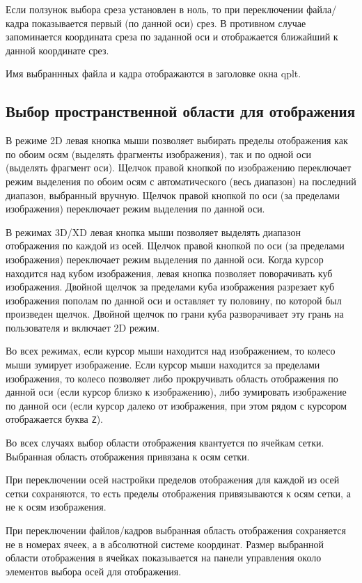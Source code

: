 \documentclass[12pt]{article}
\begin{document}
Если ползунок выбора среза установлен в ноль, то при переключении файла/кадра показывается первый (по данной оси) срез.
В противном случае запоминается координата среза по заданной оси и отображается ближайший к данной координате срез.

Имя выбраннных файла и кадра отображаются в заголовке окна qplt.

\subsection{Выбор пространственной области для отображения}
В режиме 2D левая кнопка мыши позволяет выбирать пределы отображения как по обоим осям (выделять фрагменты изображения),
так и по одной оси (выделять фрагмент оси). Щелчок правой кнопкой по изображению переключает режим выделения
по обоим осям с автоматического (весь диапазон) на последний диапазон, выбранный вручную. 
Щелчок правой кнопкой по оси (за пределами изображения) переключает режим выделения по данной оси.

В режимах 3D/XD левая кнопка мыши позволяет выделять диапазон отображения по каждой из осей. 
Щелчок правой кнопкой по оси (за пределами изображения) переключает режим выделения по данной оси.
Когда курсор  находится над кубом изображения, левая кнопка позволяет поворачивать куб изображения.
Двойной щелчок за пределами куба изображения разрезает куб изображения пополам по данной оси и оставляет ту половину,
по которой был произведен щелчок. Двойной щелчок по грани куба разворачивает эту грань на пользователя и включает 2D режим.

Во всех режимах, если курсор мыши находится над изображением, то колесо мыши зумирует изображение.
Если курсор мыши находится за пределами изображения, то колесо позволяет либо прокручивать область отображения по данной оси (если курсор
близко к изображению), либо зумировать изображение по данной оси (если курсор далеко от изображения, при этом рядом с курсором отображается буква \verb'Z').

Во всех случаях выбор области отображения квантуется по ячейкам сетки. 
Выбранная область отображения привязана к осям сетки.

При переключении осей настройки пределов отображения для каждой из осей сетки сохраняются, то есть пределы отображения привязываются к осям сетки, а не к осям изображения.

При переключении файлов/кадров выбранная область отображения сохраняется не в номерах ячеек, а в абсолютной системе координат.
Размер выбранной области отображения в ячейках показывается на панели управления около элементов выбора осей для отображения.
\end{document}
